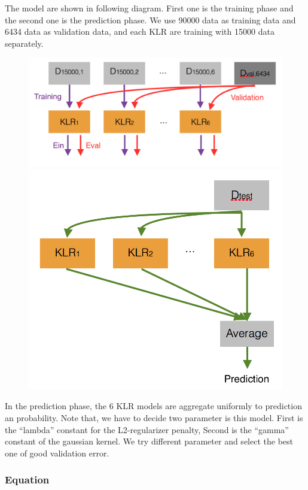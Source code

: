 \documentclass[12pt]{article}
\begin{document}
The model are shown in following diagram. First one is the training phase and the second one is the prediction phase. We use 90000 data as training data and 6434 data as validation data, and each KLR are training with 15000 data separately.
\begin{figure}[H]
	\centering
	\includegraphics[scale=0.3]{KLR-1.png}
	\includegraphics[scale=0.3]{KLR-2.png}
\end{figure}
In the prediction phase, the 6 KLR models are aggregate uniformly to prediction an probability.
Note that, we have to decide two parameter is this model. First is the “lambda” constant for the L2-regularizer penalty, Second is the “gamma” constant of the gaussian kernel. We try different parameter and select the best one of good validation error. 

\subsubsection{Equation}
\end{document}
